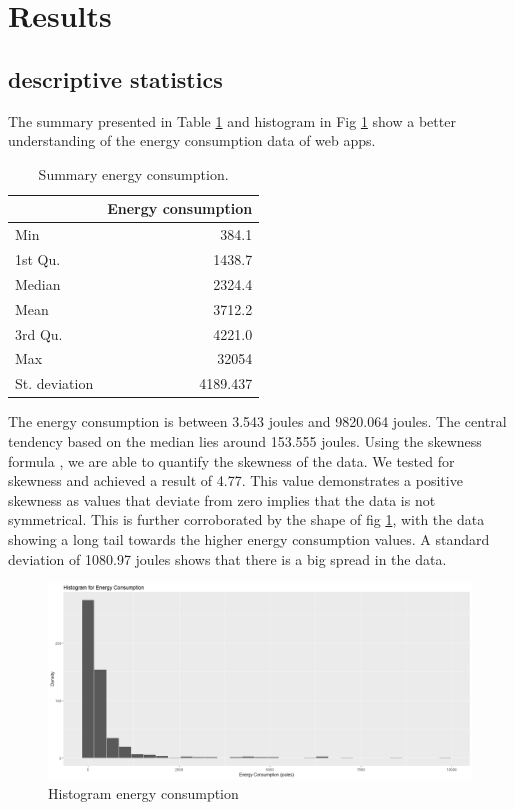 \section{Results} 
\subsection{descriptive statistics}
The summary presented in Table \ref{tab:table3} and histogram in Fig \ref{fig:histec} show a better understanding of the energy consumption data of web apps. 

\begin{table}[h!]
  \begin{center}
    \begin{tabular}{l|r} %
      \textbf{  } & \textbf{Energy consumption} \\
      \hline
      Min & 384.1\\
      1st Qu. & 1438.7\\
      Median & 2324.4\\
      Mean & 3712.2 \\
      3rd Qu. & 4221.0 \\
      Max & 32054 \\
      St. deviation & 4189.437\\
    \end{tabular}
        \caption{Summary energy consumption.}
           \label{tab:table3}
  \end{center}
\end{table}



The energy consumption is between 3.543 joules and 9820.064 joules. The central tendency based on the median lies around 153.555 joules. Using the skewness formula \cite{Rep:e1071}, we are able to quantify the skewness of the data. We tested for skewness and achieved a result of 4.77. This value demonstrates a positive skewness as values that deviate from zero implies that the data is not symmetrical. This is further corroborated by the shape of fig \ref{fig:histec}, with the data showing a long tail towards the higher energy consumption values. A standard deviation of 1080.97 joules shows that there is a big spread in the data.  

\begin{figure}[H]
  \includegraphics[width=\linewidth]{./NewImages/Fig_4_Histogram_Energy_Consumption.png}
  \caption{Histogram energy consumption}
  \label{fig:histec}
\end{figure}


